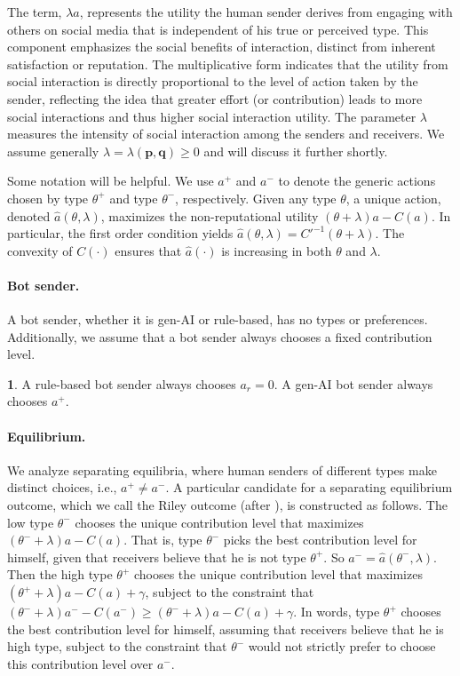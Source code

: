 \documentclass[english,12pt]{article}
\theoremstyle{plain}
\theoremstyle{plain}
\theoremstyle{definition}
\theoremstyle{definition}
\theoremstyle{assumption}
\newtheorem{assumption}{\protect\assumptionname}
\theoremstyle{plain}
\theoremstyle{plain}
\theoremstyle{plain}
\theoremstyle{plain}
\theoremstyle{definition}%
\theoremstyle{plain}
\theoremstyle{plain}
\theoremstyle{plain}
\theoremstyle{plain}
\theoremstyle{plain}
\providecommand{\assumptionname}{Assumption}
\begin{document}
The term, $\lambda a$, represents the utility the human sender derives from engaging with others on social media that is independent of his true or perceived type. This component emphasizes the social benefits of interaction, distinct from inherent satisfaction or reputation. The multiplicative form indicates that the utility from social interaction is directly proportional to the level of action taken by the sender, reflecting the idea that greater effort (or contribution) leads to more social interactions and thus higher social interaction utility. The parameter $\lambda$ measures the intensity of social interaction among the senders and receivers. We assume generally $\lambda = \lambda(\bm{p},\bm{q})\geq 0$ and will discuss it further shortly.


Some notation will be helpful. We use $a^+$ and $a^-$ to denote the generic actions chosen by type $\theta^+$ and type $\theta^-$, respectively. Given any type $\theta$, a unique action, denoted $\hat{a}(\theta,\lambda)$, maximizes the non-reputational utility $(\theta+\lambda)a - C(a)$. In particular, the first order condition yields $\hat{a}(\theta,\lambda) = C'^{-1}(\theta+\lambda)$. The convexity of $C(\cdot)$ ensures that $\hat{a}(\cdot)$ is increasing in both $\theta$ and $\lambda$.


\paragraph{Bot sender.} A bot sender, whether it is gen-AI or rule-based, has no types or preferences. Additionally, we assume that a bot sender always chooses a fixed contribution level.

\begin{assumption}
    A rule-based bot sender always chooses $a_r=0$. A gen-AI bot sender always chooses $a^+$.
\end{assumption}


\paragraph{Equilibrium.} We analyze separating equilibria, where human senders of different types make distinct choices, i.e., $a^+\neq a^-$. A particular candidate for a separating equilibrium outcome, which we call the Riley outcome (after \citealt{Riley:79}), is constructed as follows. The low type $\theta^-$ chooses the unique contribution level that maximizes $(\theta^-+\lambda)a - C(a)$. That is, type $\theta^-$ picks the best contribution level for himself, given that receivers believe that he is not type $\theta^+$. So $a^- = \hat{a}(\theta^-,\lambda)$. Then the high type $\theta^+$ chooses the unique contribution level that maximizes $(\theta^++\lambda)a - C(a) + \gamma$, subject to the constraint that $(\theta^-+\lambda)a^- - C(a^-)\geq (\theta^-+\lambda)a - C(a) + \gamma$. In words, type $\theta^+$ chooses the best contribution level for himself, assuming that receivers believe that he is high type, subject to the constraint that $\theta^-$ would not strictly prefer to choose this contribution level over $a^-$.
\end{document}
